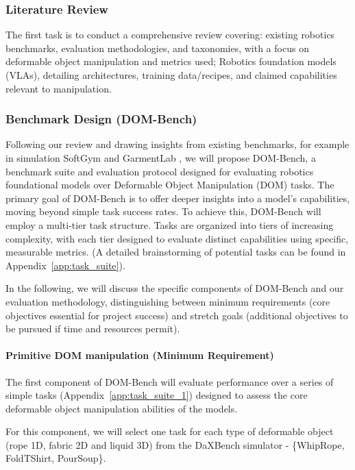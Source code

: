 \subsubsection{Literature Review} %
The first task is to conduct a comprehensive review covering: existing robotics benchmarks, evaluation methodologies, and taxonomies, with a focus on deformable object manipulation and metrics used; Robotics foundation models (VLAs), detailing architectures, training data/recipes, and claimed capabilities relevant to manipulation.

\subsubsection{Benchmark Design (DOM-Bench)}
Following our review and drawing insights from existing benchmarks, for example in simulation SoftGym \cite{SoftGym} and GarmentLab \cite{GarmentLab}, we will propose DOM-Bench, a benchmark suite and evaluation protocol designed for evaluating robotics foundational models over Deformable Object Manipulation (DOM) tasks. The primary goal of DOM-Bench is to offer deeper insights into a model's capabilities, moving beyond simple task success rates.
To achieve this, DOM-Bench will employ a multi-tier task structure. Tasks are organized into tiers of increasing complexity, with each tier designed to evaluate distinct capabilities using specific, measurable metrics. (A detailed brainstorming of potential tasks can be found in Appendix~\ref{app:task_suite}).

In the following, we will discuss the specific components of DOM-Bench and our evaluation methodology, distinguishing between minimum requirements (core objectives essential for project success) and stretch goals (additional objectives to be pursued if time and resources permit).

\paragraph{\textbf{Primitive DOM manipulation} (Minimum Requirement)}
The first component of DOM-Bench will evaluate performance over a series of simple tasks (Appendix~\ref{app:task_suite_1}) designed to assess the core deformable object manipulation abilities of the models.

\begin{domexample}
For this component, we will select one task for each type of deformable object (rope 1D, fabric 2D and liquid 3D) from the DaXBench simulator - \{WhipRope, FoldTShirt, PourSoup\}. %
\end{domexample}

